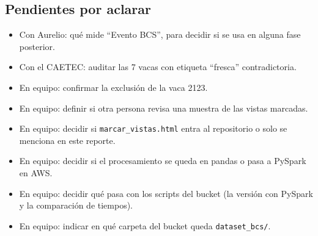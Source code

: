 \subsection{Pendientes por aclarar}

\begin{itemize}
  \item Con Aurelio: qué mide ``Evento BCS'', para decidir si se usa en alguna fase posterior.
  \item Con el CAETEC: auditar las 7 vacas con etiqueta ``fresca'' contradictoria.
  \item En equipo: confirmar la exclusión de la vaca 2123.
  \item En equipo: definir si otra persona revisa una muestra de las vistas marcadas.
  \item En equipo: decidir si \nolinkurl{marcar_vistas.html} entra al repositorio o solo se menciona en este reporte.
  \item En equipo: decidir si el procesamiento se queda en pandas o pasa a PySpark en AWS.
  \item En equipo: decidir qué pasa con los scripts del bucket (la versión con PySpark y la comparación de tiempos).
  \item En equipo: indicar en qué carpeta del bucket queda \nolinkurl{dataset_bcs/}.
\end{itemize}
